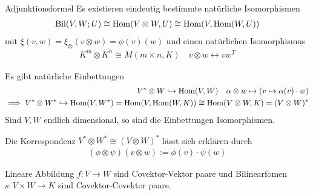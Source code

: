 

\begin{proposition}{Adjunktionsformel}
    Es existieren eindeutig bestimmte natürliche Isomorphismen
    \begin{align*}
        \text{Bil}(V,W;U) \cong \operatorname{Hom}(V \otimes W,U) \cong \operatorname{Hom}(V, \operatorname{Hom}(W,U))
    \end{align*}
    mit $\xi(v,w) = \xi_{\otimes}(v \otimes w) = \phi(v)(w)$ und einen natürlichen Isomorphismus
    \begin{align*}
        K^m \otimes K^n \cong M(m\times n,K) \quad v \otimes w \longleftrightarrow vw^T
    \end{align*}
\end{proposition}

\begin{proposition}{}
    Es gibt natürliche Einbettungen
    \begin{align*}
        V^* \otimes W \hookrightarrow \operatorname{Hom}(V,W) \quad \alpha \otimes w \mapsto (v \mapsto \alpha(v) \cdot w)\\
        \implies V^* \otimes W^* \hookrightarrow \operatorname{Hom}(V,W^*) = \operatorname{Hom}(V, \operatorname{Hom}(W,K)) \cong \operatorname{Hom}(V \otimes W,K) = (V \otimes W)^*
    \end{align*}
    Sind $V,W$ endlich dimensional, so sind die Einbettungen Isomorphismen.

    Die Korrespondenz $V^* \otimes W^* \cong (V \otimes W)^*$ lässt sich erklären durch
    \begin{align*}
        (\phi \otimes \psi)(v \otimes w) := \phi(v) \cdot \psi(w)
    \end{align*}
\end{proposition}
Lineare Abbildung $f: V \to W$ sind Covektor-Vektor paare und Bilinearfomen $s: V \times W \to K$ sind Covektor-Covektor paare.


